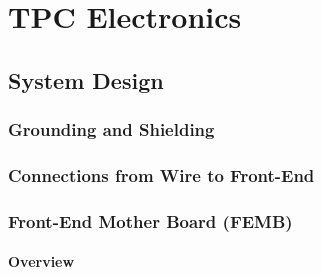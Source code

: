 \chapter{TPC Electronics}
\label{ch:sp-tpcelec}


















\section{System Design}
\label{sec:fdsp-tpc-elec-design}


\subsection{Grounding and Shielding}
\label{sec:fdsp-tpc-elec-design-ground}


\subsection{Connections from Wire to Front-End}
\label{sec:fdsp-tpc-elec-design-bias}


\subsection{Front-End Mother Board (FEMB)}
\label{sec:fdsp-tpc-elec-design-femb}


\subsubsection{Overview}
\label{sec:fdsp-tpc-elec-design-femb-ov}


